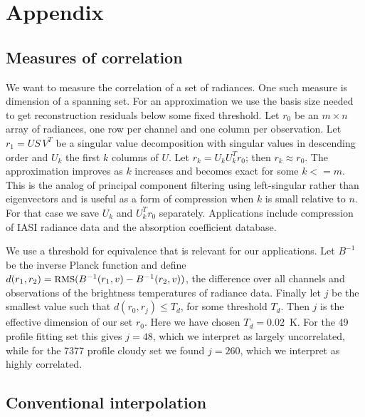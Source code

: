 \documentclass[journal]{IEEEtran}
\begin{document}
\section{Appendix}
\label{append}

\subsection{Measures of correlation}

We want to measure the correlation of a set of radiances.  One such
measure is dimension of a spanning set.  For an approximation we use
the basis size needed to get reconstruction residuals below some
fixed threshold.  Let $r_0$ be an $m \times n$ array of radiances,
one row per channel and one column per observation.  Let $r_1 = U
S\,V^T$ be a singular value decomposition with singular values in
descending order and $U_k$ the first $k$ columns of $U$.  Let $r_k =
U_k U_k^T r_0$; then $r_k \approx r_0$.  The approximation improves
as $k$ increases and becomes exact for some $k <= m$.  This is the
analog of principal component filtering using left-singular rather
than eigenvectors and is useful as a form of compression when $k$ is
small relative to $n$.  For that case we save $U_k$ and $U_k^T r_0$
separately.  Applications include compression of IASI radiance data
and the {\kcarta} absorption coefficient database.

We use a threshold for equivalence that is relevant for our
applications.  Let $B^{-1}$ be the inverse Planck function and
define $d(r_1, r_2) = \mbox{\small RMS}(B^{-1}(r_1, v) - B^{-1}(r_2, v))$, the
{\rms} difference over all channels and observations of the
brightness temperatures of radiance data.  Finally let $j$ be the
smallest value such that $d(r_0, r_j) \le T_d$, for some threshold
$T_d$.  Then $j$ is the effective dimension of our set $r_0$.  Here
we have chosen $T_d = 0.02$~K.  For the 49 profile fitting set this
gives $j=48$, which we interpret as largely uncorrelated, while for
the 7377 profile cloudy set we found $j=260$, which we interpret as
highly correlated.

\subsection{Conventional interpolation}
\label{interp}
\end{document}
